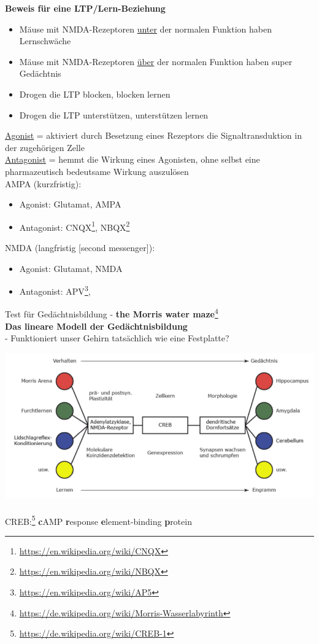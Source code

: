 \textbf{Beweis für eine LTP/Lern-Beziehung}
\begin{itemize}
	\item Mäuse mit NMDA-Rezeptoren \underline{unter} der normalen Funktion haben Lernschwäche
	\item Mäuse mit NMDA-Rezeptoren \underline{über} der normalen Funktion haben super Gedächtnis
	\item Drogen die LTP blocken, blocken lernen
	\item Drogen die LTP unterstützen, unterstützen lernen
\end{itemize}

\underline{Agonist} = aktiviert durch Besetzung eines Rezeptors die Signaltransduktion in der zugehörigen Zelle\\
\underline{Antagonist} = hemmt die Wirkung eines Agonisten, ohne selbst eine pharmazeutisch bedeutsame Wirkung auszulösen\\

AMPA (kurzfristig):
\begin{itemize}
	\item Agonist: Glutamat, AMPA
	\item Antagonist: CNQX\footnote{\url{https://en.wikipedia.org/wiki/CNQX}}, NBQX\footnote{\url{https://en.wikipedia.org/wiki/NBQX}}
\end{itemize}

NMDA (langfristig [second messenger]):
\begin{itemize}
	\item Agonist: Glutamat, NMDA
	\item Antagonist: APV\footnote{\url{https://en.wikipedia.org/wiki/AP5}}, 
\end{itemize}

Test für Gedächtnisbildung - \textbf{the Morris water maze}\footnote{\url{https://de.wikipedia.org/wiki/Morris-Wasserlabyrinth}}\\

\textbf{Das lineare Modell der Gedächtnisbildung}\\
 - Funktioniert unser Gehirn tatsächlich wie eine Festplatte?

\includegraphics[width=1\textwidth]{lectures/160622/pix/memory_genesis.png}
\\\\
CREB:\footnote{\url{https://de.wikipedia.org/wiki/CREB-1}} \textbf{c}AMP \textbf{r}esponse \textbf{e}lement-binding \textbf{p}rotein